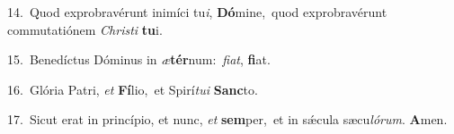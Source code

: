 {\numbfont\textcolor{\numbcolor}{14.}}~Quod exprobravérunt inimíci tu\-\textit{i}\-, \textbf{Dó}\-mine,~\star quod exprobravérunt commutatiónem \textit{Chris}\-\textit{ti} \textbf{tu}\-i.\par
{\numbfont\textcolor{\numbcolor}{15.}}~Benedíctus Dóminus in \textit{æ}\-\textbf{tér}num:~\star \textit{fi}\-\textit{at}, \textbf{fi}\-at.\par
{\numbfont\textcolor{\numbcolor}{16.}}~Glória Patri, \textit{et} \textbf{Fí}\-lio,~\star et Spirí\-\textit{tu}\-\textit{i} \textbf{Sanc}\-to.\par
{\numbfont\textcolor{\numbcolor}{17.}}~Sicut erat in princípio, et nunc, \textit{et} \textbf{sem}\-per,~\star et in sǽcula sæcu\-\textit{ló}\-\textit{rum}. \textbf{A}\-men.\par
